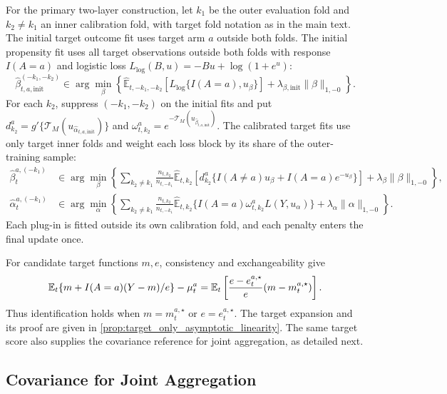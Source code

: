 \documentclass[12pt]{article}
\providecommand{\En}{\widehat{\mathbb E}}
\begin{document}
For the primary two-layer construction, let $k_1$ be the outer evaluation fold and $k_2\ne k_1$ an inner calibration fold, with target fold notation as in the main text. The initial target outcome fit uses target arm $a$ outside both folds. The initial propensity fit uses all target observations outside both folds with response $I(A=a)$ and logistic loss $L_{\mathrm{log}}(B,u)=-Bu+\log(1+e^u)$:
\[
\widehat\beta_{t,a,\mathrm{init}}^{(-k_1,-k_2)}
\in\arg\min_\beta\left\{\En_{t,-k_1,-k_2}[L_{\mathrm{log}}\{I(A=a),u_\beta\}]+\lambda_{\beta,\mathrm{init}}\|\beta\|_{1,-0}\right\}.
\]
For each $k_2$, suppress $(-k_1,-k_2)$ on the initial fits and put $d_{k_2}^a=g'\{\mathcal T_M(u_{\widehat\alpha_{t,a,\mathrm{init}}})\}$ and $\omega_{t,k_2}^a=e^{-\mathcal T_M(u_{\widehat\beta_{t,a,\mathrm{init}}})}$. The calibrated target fits use only target inner folds and weight each loss block by its share of the outer-training sample:
\[
\begin{aligned}
\widehat\beta_t^{a,(-k_1)}
&\in\arg\min_\beta\left\{\sum_{k_2\ne k_1}\frac{n_{t,k_2}}{n_{t,-k_1}}
\En_{t,k_2}\left[d_{k_2}^a\{I(A\ne a)u_\beta+I(A=a) e^{-u_\beta}\}\right]
+\lambda_\beta\|\beta\|_{1,-0}\right\},\\
\widehat\alpha_t^{a,(-k_1)}
&\in\arg\min_\alpha\left\{\sum_{k_2\ne k_1}\frac{n_{t,k_2}}{n_{t,-k_1}}
\En_{t,k_2}\{I(A=a)\omega_{t,k_2}^aL(Y,u_\alpha)\}
+\lambda_\alpha\|\alpha\|_{1,-0}\right\}.
\end{aligned}
\]
Each plug-in is fitted outside its own calibration fold, and each penalty enters the final update once.

For candidate target functions $m,e$, consistency and exchangeability give
\[
\mathbb{E}_t\{m+I(A=a)(Y-m)/e\}-\mu_t^a
=\mathbb{E}_t\left[\frac{e-e_t^{a,\star}}{e}(m-m_t^{a,\star})\right].
\]
Thus identification holds when $m=m_t^{a,\star}$ or $e=e_t^{a,\star}$. The target expansion and its proof are given in \cref{prop:target_only_asymptotic_linearity}. The same target score also supplies the covariance reference for joint aggregation, as detailed next.

\subsection{Covariance for Joint Aggregation}\label{supp:aggregation_setup}
\end{document}
